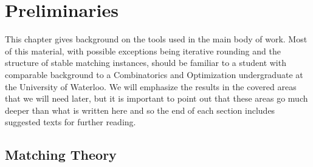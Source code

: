\chapter{Preliminaries}
This chapter gives background on the tools used in the main body of work. Most of this material, with possible exceptions being iterative rounding and the structure of stable matching instances, should be familiar to a student with comparable background to a Combinatorics and Optimization undergraduate at the University of Waterloo. We will emphasize the results in the covered areas that we will need later, but it is important to point out that these areas go much deeper than what is written here and so the end of each section includes suggested texts for further reading.

\section{Matching Theory}
